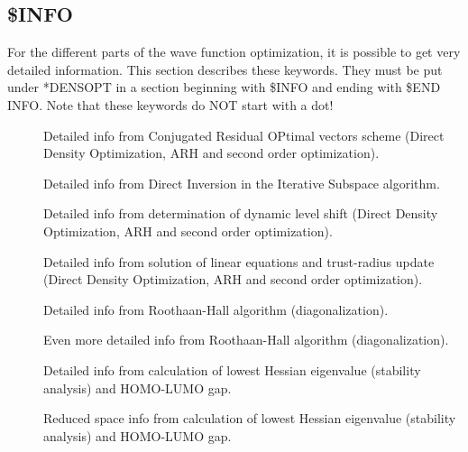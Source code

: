 \begin{description}
\subsection{\$INFO}\label{subsec:info}
For the different parts of the wave function optimization, it is possible
to get very detailed information.
This section describes these keywords. They must be put
under *DENSOPT in a section beginning with
\$INFO and ending with \$END INFO. Note that these keywords
do NOT start with a dot!
\begin{description}
\item[] Detailed info from Conjugated Residual OPtimal vectors scheme (Direct Density Optimization, ARH and second order optimization).
\item[] Detailed info from Direct Inversion in the Iterative Subspace algorithm.
\item[] Detailed info from determination of dynamic level shift (Direct Density Optimization, ARH and second order optimization). 
\item[] Detailed info from solution of linear equations and trust-radius update (Direct Density Optimization, ARH and second order optimization).
\item[] Detailed info from Roothaan-Hall algorithm (diagonalization).
\item[] Even more detailed info from Roothaan-Hall algorithm (diagonalization).
\item[] Detailed info from calculation of lowest Hessian eigenvalue (stability analysis) and HOMO-LUMO gap.
\item[] Reduced space info from calculation of lowest Hessian eigenvalue (stability analysis) and HOMO-LUMO gap.
\item[\Keyinfo{}]
\end{description}\end{description}

